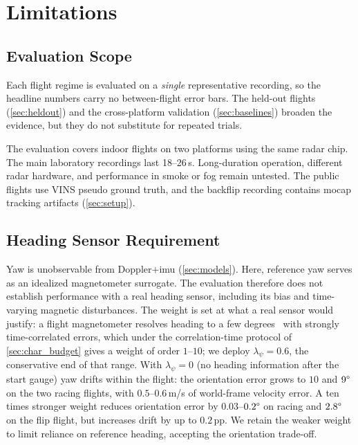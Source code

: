 \section{Limitations}
\label{sec:limits}

\subsection{Evaluation Scope}
\label{sec:stat_scope}
Each flight regime is evaluated on a \emph{single} representative
recording, so the headline numbers carry no between-flight error bars.  The
held-out flights (\autoref{sec:heldout}) and the cross-platform validation
(\autoref{sec:baselines}) broaden the evidence, but they do not substitute
for repeated trials.

The evaluation covers indoor flights on two platforms using the same
radar chip.  The main laboratory recordings last 18--26\,s.
Long-duration operation, different radar hardware, and performance
in smoke or fog remain untested.  The public flights use VINS pseudo
ground truth, and the backflip recording contains \ac{mocap} tracking
artifacts (\autoref{sec:setup}).

\subsection{Heading Sensor Requirement}
\label{sec:yaw}
Yaw is unobservable from Doppler$+$\ac{imu} (\autoref{sec:models}).
Here, reference yaw serves as an idealized magnetometer surrogate.
The evaluation therefore does not establish performance with a real
heading sensor, including its bias and time-varying magnetic
disturbances.  The weight is set at what a real sensor would justify:
a flight magnetometer resolves heading to a few degrees~\cite{kok2016magnetometer} with strongly
time-correlated errors, which under the correlation-time protocol of
\autoref{sec:char_budget} gives a weight of order $1$--$10$; we deploy
$\lambda_\psi = 0.6$, the conservative end of that range.  With
$\lambda_\psi = 0$ (no heading information after the start gauge) yaw
drifts within the flight: the orientation error grows to $10$ and
$9\degree$ on the two racing flights, with $0.5$--$0.6$\,m/s of
world-frame velocity error.  A ten times stronger weight reduces
orientation error by $0.03$--$0.2\degree$ on racing and $2.8\degree$
on the flip flight, but increases drift by up to $0.2$\,pp.
We retain the weaker weight to limit reliance on reference heading,
accepting the orientation trade-off.

